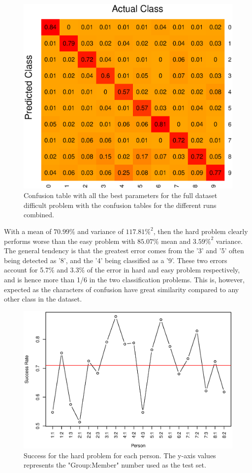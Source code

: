 \begin{figure}[H]
\centering
\includegraphics[width = 0.65 \textwidth]{graphics/knn_confusion_bestparam_hard}
\caption[Confusion table for the hard problem.]{Confusion table with all the best parameters for the full dataset difficult problem with the confusion tables for the different runs combined.}
\label{fig:knn_conf_final_hard}
\end{figure}



With a mean of $70.99\%$ and variance of  $117.81\%^2$, then the hard problem clearly performs worse than the easy problem with $85.07\%$ mean and $3.59\%^2$ variance.
The general tendency is that the greatest error comes from the '3' and '5' often being detected as '8', and the '4' being classified as a '9'.
These two errors account for 5.7\% and 3.3\% of the error in hard and easy problem respectively, and is hence more than 1/6 in the two classification problems.
This is, however, expected as the characters of confusion have great similarity compared to any other class in the dataset.

\begin{figure}[H]
\centering
\includegraphics[width = 0.95 \textwidth]{graphics/knn_final_full_hard}
\caption[Success for K-NN for the hard problem.]{Success for the hard problem for each person.
The y-axis values represents the "Group:Member" number used as the test set.}
\label{fig:knn_succ_final_hard}
\end{figure}